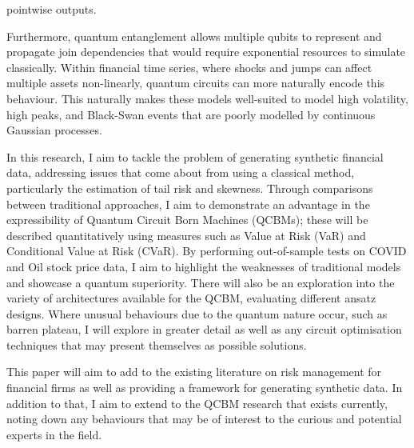 \documentclass[12pt]{article}
\newcommand{\newp}
    {
    \vskip 0.5cm 
  }
\numberwithin{equation}{section}
\begin{document}
pointwise outputs. 
\newp
Furthermore, quantum entanglement allows multiple qubits to represent and propagate 
join dependencies that would require exponential resources to simulate classically. 
Within financial time series, where shocks and jumps can affect multiple assets 
non-linearly, quantum circuits can more naturally encode this behaviour. This 
naturally makes these models well-suited to model high volatility, high peaks, 
and Black-Swan events that are poorly modelled by continuous Gaussian processes. 
\newp 
In this research, I aim to tackle the problem 
of generating synthetic financial data, addressing issues that come about from 
using a classical method, particularly the estimation of tail risk and skewness. 
Through comparisons between traditional approaches, 
I aim to demonstrate an advantage in the expressibility of Quantum Circuit Born 
Machines (QCBMs); these will be described quantitatively using measures such as 
Value at Risk (VaR) and Conditional Value at Risk (CVaR). By performing out-of-sample 
tests on COVID and Oil stock price data, I aim to highlight the weaknesses of traditional models 
and showcase a quantum superiority.
There will also be an exploration into the variety of architectures 
available for the QCBM, evaluating different ansatz designs. Where unusual behaviours
due to the quantum nature occur, such as barren plateau, I will explore in greater detail 
as well as any circuit optimisation techniques that may present themselves as 
possible solutions. 
\newp
This paper will aim to add to the existing literature on risk management for 
financial firms as well as providing a framework for generating synthetic 
data. In addition to that, I aim to extend to the QCBM research that exists 
currently, noting down any behaviours that may be of interest to the curious 
and potential experts in the field.

\newpage
\end{document}
